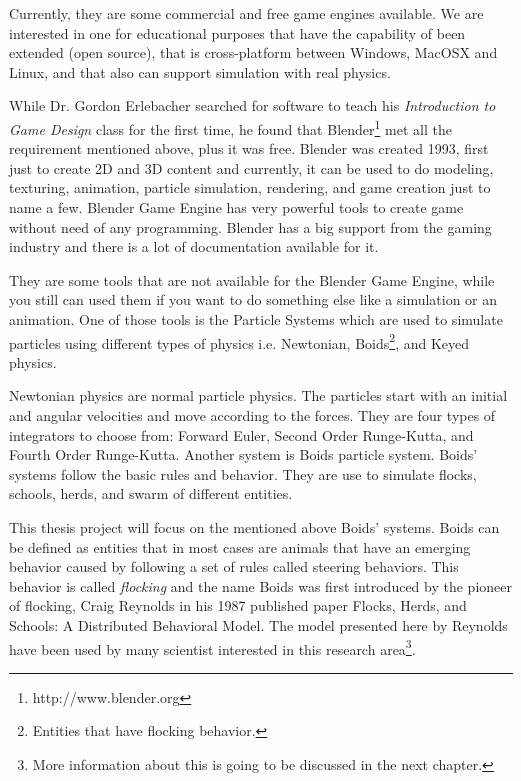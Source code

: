 
Currently, they are some commercial and free game engines available. We are interested in one for educational purposes that have the capability of been extended (open source), that is cross-platform between Windows, MacOSX and Linux, and that also can support simulation with real physics. 


While Dr. Gordon Erlebacher searched for software to teach his \textit{Introduction to Game Design} class for the first time, he found that Blender\footnote{http://www.blender.org} met all the requirement mentioned above, plus it was free. Blender was created 1993, first just to create 2D and 3D content and currently, it can be used to do modeling, texturing, animation, particle simulation, rendering, and game creation just to name a few. Blender Game Engine has very powerful tools to create game without need of any programming. Blender has a big support from the gaming industry and there is a lot of documentation available for it.  


They are some tools that are not available for the Blender Game Engine, while you still can used them if you want to do something else like a simulation or an animation. One of those tools is the Particle Systems which are used to simulate particles using different types of physics i.e. Newtonian, Boids\footnote{Entities that have flocking behavior.}, and Keyed physics. 



Newtonian physics are normal particle physics. The particles start with an initial and angular velocities and move according to the forces. They are four types of integrators to choose from: Forward Euler, Second Order Runge-Kutta, and Fourth Order Runge-Kutta. Another system is Boids particle system. Boids' systems follow the basic rules and behavior. They are use to simulate flocks, schools, herds, and swarm of different entities.

This thesis project will focus on the mentioned above Boids' systems. Boids can be defined as entities that in most cases are animals that have an emerging behavior caused by following a set of rules called steering behaviors. This behavior is called \textit{flocking} and the name Boids was first introduced by the pioneer of flocking, Craig Reynolds in his 1987 published paper Flocks, Herds, and Schools: A Distributed Behavioral Model\cite{craig1}. The model presented here by Reynolds have been used by many scientist interested in this research area\footnote{More information about this is going to be discussed in the next chapter.}.

